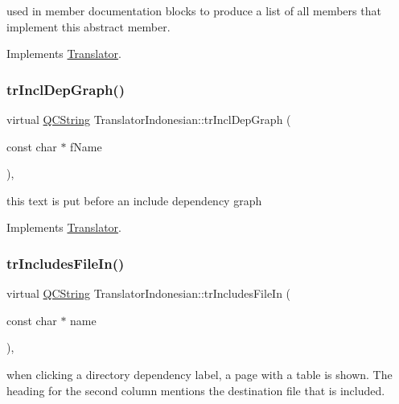 used in member documentation blocks to produce a list of all members that implement this abstract member. 

Implements \mbox{\hyperlink{class_translator}{Translator}}.

\mbox{\label{class_translator_indonesian_a4889c0e4732faffc8ec24a4ddd1b43cb}} 
\subsubsection{\texorpdfstring{trInclDepGraph()}{trInclDepGraph()}}
{\footnotesize\ttfamily virtual \mbox{\hyperlink{class_q_c_string}{Q\+C\+String}} Translator\+Indonesian\+::tr\+Incl\+Dep\+Graph (\begin{DoxyParamCaption}\item[{const char $\ast$}]{f\+Name }\end{DoxyParamCaption})\hspace{0.3cm}{\ttfamily [inline]}, {\ttfamily [virtual]}}

this text is put before an include dependency graph 

Implements \mbox{\hyperlink{class_translator}{Translator}}.

\mbox{\label{class_translator_indonesian_af7933fe57ee5754ad214b9363f5ee7c1}} 
\subsubsection{\texorpdfstring{trIncludesFileIn()}{trIncludesFileIn()}}
{\footnotesize\ttfamily virtual \mbox{\hyperlink{class_q_c_string}{Q\+C\+String}} Translator\+Indonesian\+::tr\+Includes\+File\+In (\begin{DoxyParamCaption}\item[{const char $\ast$}]{name }\end{DoxyParamCaption})\hspace{0.3cm}{\ttfamily [inline]}, {\ttfamily [virtual]}}

when clicking a directory dependency label, a page with a table is shown. The heading for the second column mentions the destination file that is included. 

